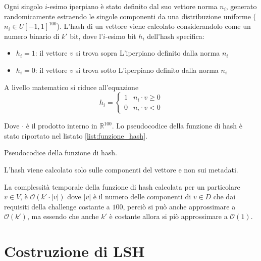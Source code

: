 Ogni singolo $i$-esimo iperpiano è stato definito dal suo vettore norma $n_i$,
generato randomicamente estraendo le singole componenti da una distribuzione uniforme 
($n_i \in U[-1,1]^{100}$). L'hash di un vettore viene calcolato considerandolo 
come un numero binario di $k'$ bit, dove l'$i$-esimo bit $h_i$ dell'hash specifica:
\begin{itemize}
    \item $h_i = 1$: il vettore $v$ si trova sopra L'iperpiano definito dalla 
    norma $n_i$
    \item $h_i = 0$: il vettore $v$ si trova sotto L'iperpiano definito dalla 
    norma $n_i$
\end{itemize}

A livello matematico si riduce all'equazione 
$$h_i = \begin{cases}
    1 & n_i \cdot v \ge 0\\
    0 & n_i \cdot v < 0
\end{cases}$$ 

Dove $\cdot$ è il prodotto interno in $\mathbb{R}^{100}$. Lo pseudocodice della 
funzione di hash è stato riportato nel listato \ref{list:funzione_hash}.

\begin{algorithm}
    \SetAlgoLined

    \caption{Pseudocodice della funzione di hash.}
    \label{list:funzione_hash}
\end{algorithm}

\begin{nota}
    L'hash viene calcolato solo sulle componenti del vettore e non sui metadati.
\end{nota}

La complessità temporale della funzione di hash calcolata per un particolare $v\in V$,
è $\mathcal{O}(k' \cdot |v|)$ dove 
$|v|$ è il numero delle componenti di $v\in D$ che dai requisiti della challenge 
costante a $100$, perciò si può anche approssimare a $\mathcal{O}(k')$, ma essendo 
che anche $k'$ è costante allora si piò approssimare a $\mathcal{O}(1)$.

\section{Costruzione di LSH}

